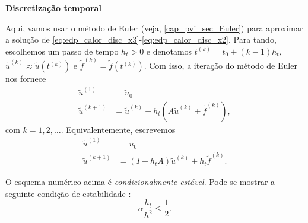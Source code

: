 \begin{flushleft}
  {\bf Discretização temporal}
\end{flushleft}

Aqui, vamos usar o método de Euler (veja, \ref{cap_pvi_sec_Euler}) para aproximar a solução de \eqref{eq:edp_calor_disc_x3}-\eqref{eq:edp_calor_disc_x2}. Para tando, escolhemos um passo de tempo $h_t>0$ e denotamos $t^{(k)} = t_0 + (k-1)h_t$, $\tilde{u}^{(k)}\approx \tilde{u}(t^{(k)})$ e $\tilde{f}^{(k)} = \tilde{f}(t^{(k)})$. Com isso, a iteração do método de Euler nos fornece
\begin{align}
  \tilde{u}^{(1)} &= \tilde{u}_0\\
  \tilde{u}^{(k+1)} &= \tilde{u}^{(k)} + h_t\left(A\tilde{u}^{(k)}+\tilde{f}^{(k)}\right),
\end{align}
com $k=1, 2, \ldots$. Equivalentemente, escrevemos
\begin{align}
  \tilde{u}^{(1)} &= \tilde{u}_0\\
  \tilde{u}^{(k+1)} &= \left(I - h_tA\right)\tilde{u}^{(k)} + h_t\tilde{f}^{(k)}.
\end{align}

\begin{obs}
  O esquema numérico acima é \emph{condicionalmente estável}. Pode-se mostrar a seguinte condição de estabilidade \cite[Cap. 12, Seç. 2]{Burden2015a}:
  \begin{equation}
    \alpha\frac{h_t}{h^2}\leq \frac{1}{2}.
  \end{equation}
\end{obs}

